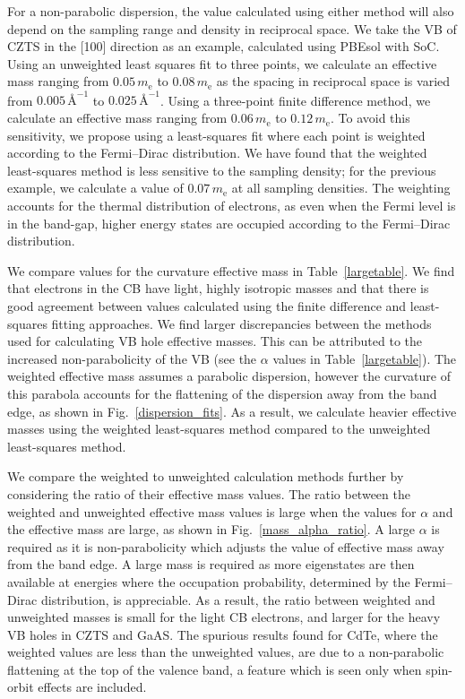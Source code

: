 For a non-parabolic dispersion, the value calculated using either method will also depend on the sampling range and density in reciprocal space. 
We take the VB of CZTS in the [100] direction as an example, calculated using PBEsol with SoC.
Using an unweighted least squares fit to three points, we calculate an effective mass ranging from $0.05\,m_\text{e}$ to $0.08\,m_\text{e}$ as the spacing in reciprocal space is varied from $0.005\,\text{\AA}^{-1}$ to $0.025\,\text{\AA}^{-1}$.
Using a three-point finite difference method, we calculate an effective mass ranging from $0.06\,m_\text{e}$ to $0.12\,m_\text{e}$.
To avoid this sensitivity, we propose using a least-squares fit where each point is weighted according to the Fermi--Dirac distribution.
We have found that the weighted least-squares method is less sensitive to the sampling density; 
for the previous example, we calculate a value of $0.07\,m_\text{e}$ at all sampling densities. 
The weighting accounts for the thermal distribution of electrons, as even when the Fermi level is in the band-gap, higher energy states are occupied according to the Fermi--Dirac distribution. 

We compare values for the curvature effective mass in Table\ \ref{largetable}. 
We find that electrons in the CB have light, highly isotropic masses and that there is good agreement between values calculated using the finite difference and least-squares fitting approaches. 
We find larger discrepancies between the methods used for calculating VB hole effective masses. 
This can be attributed to the increased non-parabolicity of the VB (see the $\alpha$ values in Table\ \ref{largetable}). 
The weighted effective mass assumes a parabolic dispersion, however the curvature of this parabola accounts for the flattening of the dispersion away from the band edge, as shown in Fig.\ \ref{dispersion_fits}. 
As a result, we calculate heavier effective masses using the weighted least-squares method compared to the unweighted least-squares method. 

We compare the weighted to unweighted calculation methods further by considering the ratio of their effective mass values.
The ratio between the weighted and unweighted effective mass values is large when the values for $\alpha$ and the effective mass are large, as shown in Fig.\ \ref{mass_alpha_ratio}. 
A large $\alpha$ is required as it is non-parabolicity which adjusts the value of effective mass away from the band edge.
A large mass is required as more eigenstates are then available at energies where the occupation probability, determined by the Fermi--Dirac distribution, is appreciable. 
As a result, the ratio between weighted and unweighted masses is small for the light CB electrons, and larger for the heavy VB holes in CZTS and GaAS. 
The spurious results found for CdTe, where the weighted values are less than the unweighted values, are due to a non-parabolic flattening at the top of the valence band, a feature which is seen only when spin-orbit effects are included.

